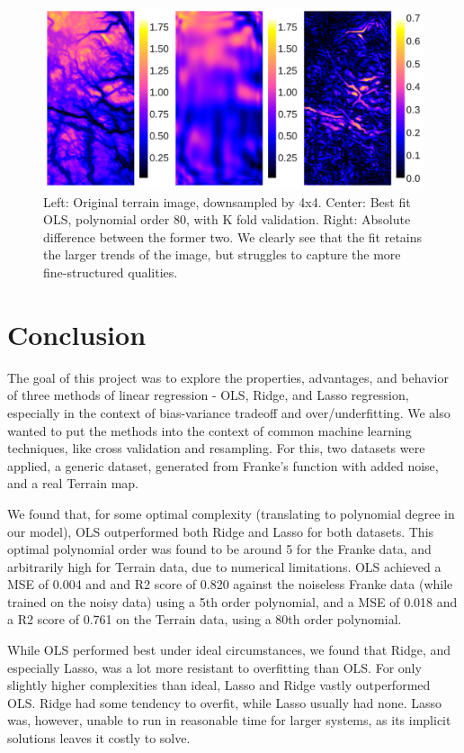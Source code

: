 \documentclass[10pt, twocolumn]{article}
\begin{document}
\begin{figure}[h!]
    \centering
    \includegraphics[scale=0.4]{../figs/BestFitTerrain.pdf}
    \caption{Left: Original terrain image, downsampled by 4x4. Center: Best fit OLS, polynomial order 80, with K fold validation. Right: Absolute difference between the former two. We clearly see that the fit retains the larger trends of the image, but struggles to capture the more fine-structured qualities.}
    \label{fig:BestFitTerrain}
\end{figure}


\section{Conclusion}
The goal of this project was to explore the properties, advantages, and behavior of three methods of linear regression - OLS, Ridge, and Lasso regression, especially in the context of bias-variance tradeoff and over/underfitting. We also wanted to put the methods into the context of common machine learning techniques, like cross validation and resampling. For this, two datasets were applied, a generic dataset, generated from Franke's function with added noise, and a real Terrain map.

We found that, for some optimal complexity (translating to polynomial degree in our model), OLS outperformed both Ridge and Lasso for both datasets. This optimal polynomial order was found to be around 5 for the Franke data, and arbitrarily high for Terrain data, due to numerical limitations. OLS achieved a MSE of 0.004 and and R2 score of 0.820 against the noiseless Franke data (while trained on the noisy data) using a 5th order polynomial, and a MSE of 0.018 and a R2 score of 0.761 on the Terrain data, using a 80th order polynomial.

While OLS performed best under ideal circumstances, we found that Ridge, and especially Lasso, was a lot more resistant to overfitting than OLS. For only slightly higher complexities than ideal, Lasso and Ridge vastly outperformed OLS. Ridge had some tendency to overfit, while Lasso usually had none. Lasso was, however, unable to run in reasonable time for larger systems, as its implicit solutions leaves it costly to solve.
\end{document}
